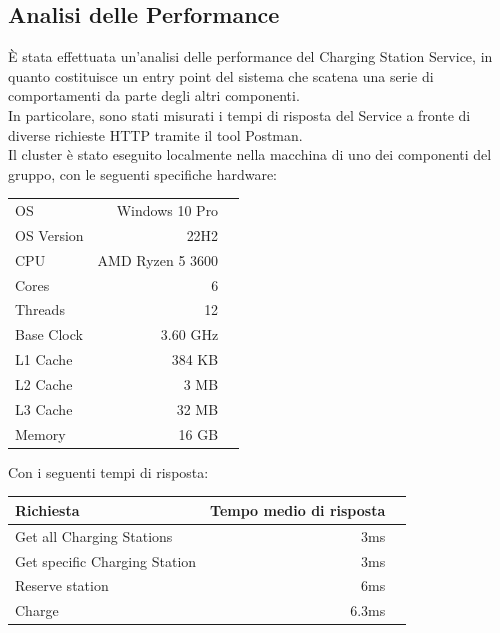 \subsection{Analisi delle Performance}
È stata effettuata un'analisi delle performance del Charging Station Service, in quanto costituisce un entry point del sistema che scatena una serie di comportamenti da parte degli altri componenti.\\
In particolare, sono stati misurati i tempi di risposta del Service a fronte di diverse richieste HTTP tramite il tool Postman.\\
Il cluster è stato eseguito localmente nella macchina di uno dei componenti del gruppo, con le seguenti specifiche hardware:\\

\begin{tabular}{l|rr}
  \hline
    OS            & Windows 10 Pro          \\
    OS Version    & 22H2                    \\
    CPU           & AMD Ryzen 5 3600        \\
    Cores         & 6                       \\
    Threads       & 12                      \\
    Base Clock    & 3.60 GHz                \\
    L1 Cache      & 384 KB                  \\
    L2 Cache      & 3 MB                    \\
    L3 Cache      & 32 MB                   \\
    Memory        & 16 GB                   \\
  \hline
\end{tabular}

\vspace{1cm}
Con i seguenti tempi di risposta:\\

\begin{tabular}{l|rr}
  Richiesta & Tempo medio di risposta                \\
  \hline
    Get all Charging Stations            & 3ms       \\
    Get specific Charging Station        & 3ms       \\
    Reserve station                      & 6ms       \\
    Charge                               & 6.3ms     \\
  \hline
\end{tabular}

